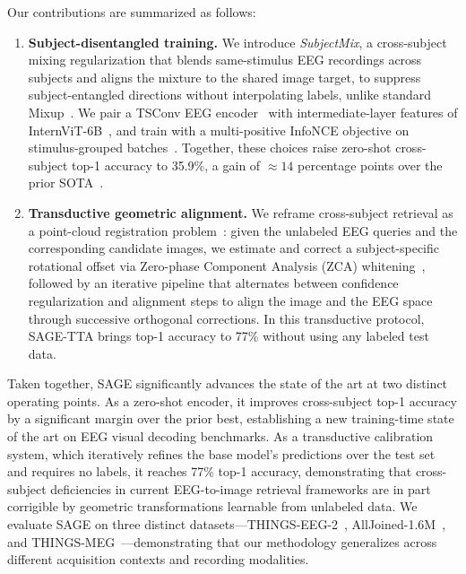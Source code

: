 \documentclass{article}
\begin{document}
Our contributions are summarized as follows:
\begin{enumerate}
  \item \textbf{Subject-disentangled training.}
    We introduce \emph{SubjectMix}, a cross-subject mixing regularization that blends same-stimulus EEG recordings across subjects and aligns the mixture to the shared image target, to suppress subject-entangled directions without interpolating labels, unlike standard Mixup~\cite{zhang2018mixup}.
    We pair a TSConv EEG encoder~\cite{song2024nice} with intermediate-layer features of InternViT-6B~\cite{chen2024internvl}, and train with a multi-positive InfoNCE objective on stimulus-grouped batches~\cite{khosla2020supcon}.
    Together, these choices raise zero-shot cross-subject top-1 accuracy to 35.9\%, a gain of ${\approx}14$ percentage points over the prior SOTA~\cite{du2025shallow}.

  \item \textbf{Transductive geometric alignment.}
     We reframe cross-subject retrieval as a point-cloud registration problem~\cite{besl1992method,grave2019wasserstein}: given the unlabeled EEG queries and the corresponding candidate images, we estimate and correct a subject-specific rotational offset via Zero-phase Component Analysis (ZCA) whitening~\cite{bell1995infomax}, followed by an iterative pipeline that alternates between confidence regularization and alignment steps to align the image and the EEG space through successive orthogonal corrections. In this transductive protocol, SAGE-TTA brings top-1 accuracy to 77\% without using any labeled test data.

\end{enumerate}

Taken together, SAGE significantly advances the state of the art at two distinct operating points.
As a zero-shot encoder, it improves cross-subject top-1 accuracy by a significant margin over the prior best, establishing a new training-time state of the art on EEG visual decoding benchmarks\cite{gifford2022things,xu2025alljoined,hebart2025thingsmeg}.
As a transductive calibration system, which iteratively refines the base model's predictions over the test set and requires no labels, it reaches 77\% top-1 accuracy, demonstrating that cross-subject deficiencies in current EEG-to-image retrieval frameworks are in part corrigible by geometric transformations learnable from unlabeled data. We evaluate SAGE on three distinct datasets—THINGS-EEG-2~\cite{gifford2022things}, AllJoined-1.6M~\cite{xu2025alljoined}, and THINGS-MEG~\cite{hebart2025thingsmeg}—demonstrating that our methodology generalizes across different acquisition contexts and recording modalities.
\end{document}
